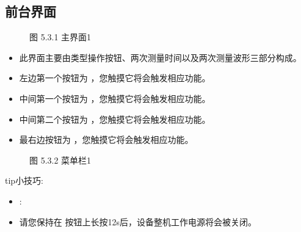 \documentclass[a4paper,10pt,english]{sphinxmanual}
\begin{document}
\subsection{前台界面}
\label{\detokenize{operation_guide:id4}}
\begin{figure}[htbp]
\centering
\capstart

\noindent{}
\caption{图 5.3.1 主界面1}\label{\detokenize{operation_guide:id9}}\end{figure}
\begin{itemize}
\item {} 
\sphinxAtStartPar
此界面主要由类型操作按钮、两次测量时间以及两次测量波形三部分构成。

\item {} 
\sphinxAtStartPar
左边第一个按钮为  ，您触摸它将会触发相应功能。

\item {} 
\sphinxAtStartPar
中间第一个按钮为  ，您触摸它将会触发相应功能。

\item {} 
\sphinxAtStartPar
中间第二个按钮为 ，您触摸它将会触发相应功能。

\item {} 
\sphinxAtStartPar
最右边按钮为  ，您触摸它将会触发相应功能。

\end{itemize}

\begin{figure}[htbp]
\centering
\capstart

\noindent{}
\caption{图 5.3.2 菜单栏1}\label{\detokenize{operation_guide:id10}}\end{figure}

\begin{sphinxadmonition}{tip}{小技巧:}\begin{itemize}
\item {} 
\sphinxAtStartPar
{} :

\item {} 
\sphinxAtStartPar
请您保持在  按钮上长按1\sphinxhyphen{}2s后，设备整机工作电源将会被关闭。

\end{itemize}
\end{sphinxadmonition}
\end{document}
